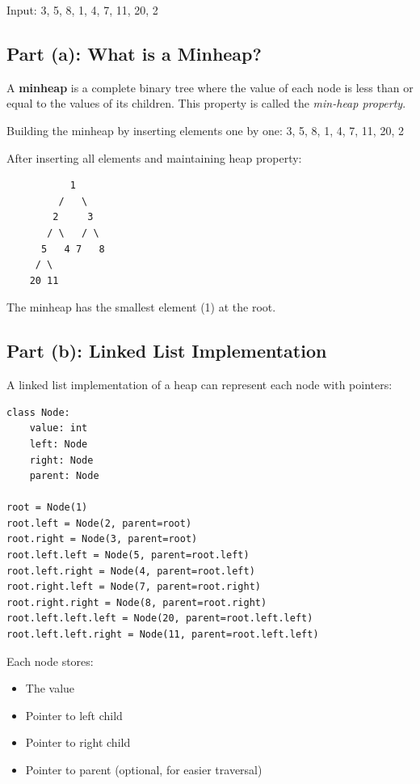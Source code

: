 \documentclass[12pt,a4paper]{article}
\begin{document}
Input: 3, 5, 8, 1, 4, 7, 11, 20, 2

\subsection{Part (a): What is a Minheap?}

A \textbf{minheap} is a complete binary tree where the value of each node is less than or equal to the values of its children. This property is called the \textit{min-heap property}.

Building the minheap by inserting elements one by one: 3, 5, 8, 1, 4, 7, 11, 20, 2

After inserting all elements and maintaining heap property:

\begin{verbatim}
           1
         /   \
        2     3
       / \   / \
      5   4 7   8
     / \
    20 11
\end{verbatim}

The minheap has the smallest element (1) at the root.

\subsection{Part (b): Linked List Implementation}

A linked list implementation of a heap can represent each node with pointers:

\begin{verbatim}
class Node:
    value: int
    left: Node
    right: Node
    parent: Node
    
root = Node(1)
root.left = Node(2, parent=root)
root.right = Node(3, parent=root)
root.left.left = Node(5, parent=root.left)
root.left.right = Node(4, parent=root.left)
root.right.left = Node(7, parent=root.right)
root.right.right = Node(8, parent=root.right)
root.left.left.left = Node(20, parent=root.left.left)
root.left.left.right = Node(11, parent=root.left.left)
\end{verbatim}

Each node stores:
\begin{itemize}
    \item The value
    \item Pointer to left child
    \item Pointer to right child
    \item Pointer to parent (optional, for easier traversal)
\end{itemize}
\end{document}
